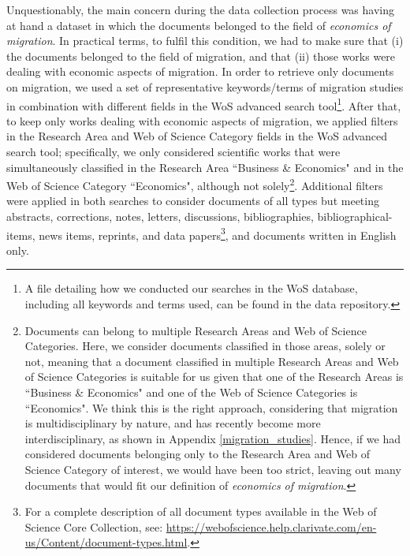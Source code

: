 Unquestionably, the main concern during the data collection process was having at hand a dataset in which the documents belonged to the field of \textit{economics of migration}. In practical terms, to fulfil this condition, we had to make sure that (i) the documents belonged to the field of migration, and that (ii) those works were dealing with economic aspects of migration. In order to retrieve only documents on migration, we used a set of representative keywords/terms of migration studies in combination with different fields in the WoS advanced search tool\footnote{A file detailing how we conducted our searches in the WoS database, including all keywords and terms used, can be found in the data repository.}. After that, to keep only works dealing with economic aspects of migration, we applied filters in the Research Area and Web of Science Category fields in the WoS advanced search tool; specifically, we only considered scientific works that were simultaneously classified in the Research Area ``Business \& Economics" and in the Web of Science Category ``Economics", although not solely\footnote{Documents can belong to multiple Research Areas and Web of Science Categories. Here, we consider documents classified in those areas, solely or not, meaning that a document classified in multiple Research Areas and Web of Science Categories is suitable for us given that one of the Research Areas is ``Business \& Economics" and one of the Web of Science Categories is ``Economics". We think this is the right approach, considering that migration is multidisciplinary by nature, and has recently become more interdisciplinary, as shown in Appendix \ref{migration_studies}. Hence, if we had considered documents belonging only to the Research Area and Web of Science Category of interest, we would have been too strict, leaving out many documents that would fit our definition of \textit{economics of migration}.}.  Additional filters were applied in both searches to consider documents of all types but meeting abstracts, corrections, notes, letters, discussions, bibliographies, bibliographical-items, news items, reprints, and data papers\footnote{For a complete description of all document types available in the Web of Science Core Collection, see: \url{https://webofscience.help.clarivate.com/en-us/Content/document-types.html}.}, and documents written in English only.

